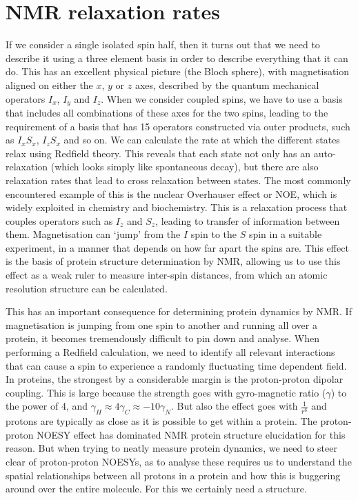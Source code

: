 \documentclass[showkeys,aps,prb,prepreint,amssymb, amsmath,nobibnotes]{article}
\begin{document}
 
 
  \section{NMR relaxation rates}

  If we consider a single isolated spin half, then it turns out that we need to describe it using a three element basis in order to describe everything that it can do. This has an excellent physical picture (the Bloch sphere), with magnetisation aligned on either the $x$, $y$ or $z$ axes, described by the quantum mechanical operators $I_x$, $I_y$ and $I_z$. When we consider coupled spins, we have to use a basis that includes all combinations of these axes for the two spins, leading to the requirement of a basis that has 15 operators constructed via outer products, such as $I_xS_x$, $I_zS_x$ and so on. We can calculate the rate at which the different states relax using Redfield theory. This reveals that each state not only has an auto-relaxation (which looks simply like spontaneous decay), but there are also relaxation rates that lead to cross relaxation between states. The most commonly encountered example of this is the nuclear Overhauser effect or NOE, which is widely exploited in chemistry and biochemistry. This is a relaxation process that couples operators such as $I_z$ and $S_z$, leading to transfer of information between them. Magnetisation can `jump' from the $I$ spin to the $S$ spin in a suitable experiment, in a manner that depends on how far apart the spins are. This effect is the basis of protein structure determination by NMR, allowing us to use this effect as a weak ruler to measure inter-spin distances, from which an atomic resolution structure can be calculated.

  This has an important consequence for determining protein dynamics by NMR. If magnetisation is jumping from one spin to another and running all over a protein, it becomes tremendously difficult to pin down and analyse. When performing a Redfield calculation, we need to identify all relevant interactions that can cause a spin to experience a randomly fluctuating time dependent field. In proteins, the strongest by a considerable margin is the proton-proton dipolar coupling. This is large because the strength goes with gyro-magnetic ratio ($\gamma$) to the power of 4, and $\gamma_H\approx 4 \gamma_C \approx -10 \gamma_N$. But also the effect goes with $\frac{1}{r^6}$ and protons are typically as close as it is possible to get within a protein. The proton-proton NOESY effect has dominated NMR protein structure elucidation for this reason. But when trying to neatly measure protein dynamics, we need to steer clear of proton-proton NOESYs, as to analyse these requires us to understand the spatial relationships between all protons in a protein and how this is buggering around over the entire molecule. For this we certainly need a structure.
\end{document}
